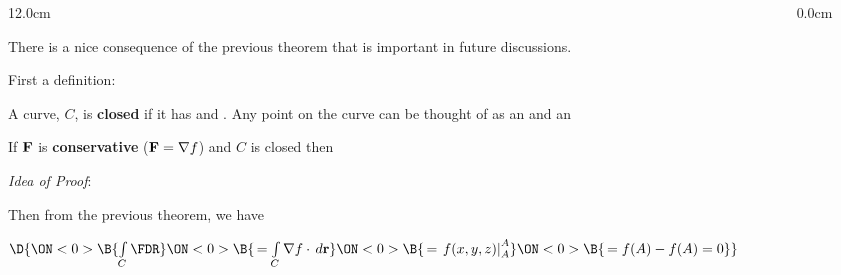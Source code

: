 \begin{frame}
\begin{columns}\begin{column}{12.0cm}

\vspace{0.1cm}

\scriptsize

There is a nice consequence of the previous theorem that is important in future discussions.

\vspace{0.4cm}

First a definition:

\vspace{0.4cm}

\DEF A curve, $C$, is {\bf closed} if it has 
 and 
.  Any point on the curve can be thought of as an
 and an

\vspace{0.5cm}

\THM If ${\bf F}$ is {\bf conservative} (${\bf F} = \nabla f$) and $C$ is closed then

\vspace{0.1cm}

\begin{center}
\end{center}

\vspace{0.2cm}

{\em Idea of Proof}:  

\vspace{0.3cm}

Then from the previous theorem, we have

\vspace{0.4cm}

\begin{center}
	$\D{
	\ON<0>{\B{\int \limits_{C} \FDR }}
	\ON<0>{\B{\, = \int \limits_{C} \nabla f \cdot \, d{\bf r} }}
	\ON<0>{\B{\, = \left.f(x,y,z)\right|_A^A }}
	\ON<0>{\B{\, = f(A) - f(A) = 0}}}$
\end{center}

\vspace{0.8cm}

\end{column}\begin{column}{0.0cm}\end{column}\end{columns}
\end{frame}

